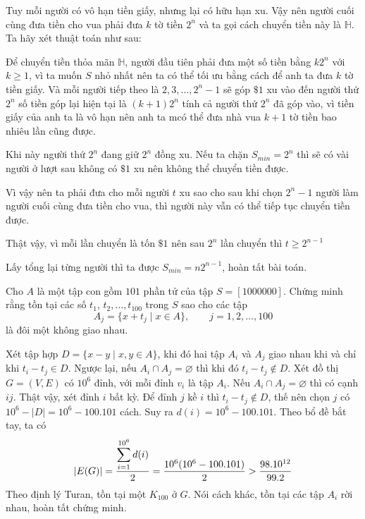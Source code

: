 \documentclass[11pt]{scrartcl}
\begin{document}
\begin{itemize}[label=, leftmargin=0em, itemsep=0.5em]
    \begin{sol}
        Tuy mỗi người có vô hạn tiền giấy, nhưng lại có hữu hạn xu. Vậy nên người cuối cùng đưa tiền cho vua phải đưa $k$ tờ tiền $2^n$ và ta gọi cách chuyển tiền này là $\mathbb{H}$. Ta hãy xét thuật toán như sau:

        Để chuyển tiền thỏa mãn $\mathbb{H}$, người đầu tiên phải đưa một số tiền bằng $k2^n$ với $k \geq 1$, vì ta muốn $S$ nhỏ nhất nên ta có thể tối ưu bằng cách để anh ta đưa $k$ tờ tiền giấy. Và mỗi người tiếp theo là $2,3,\dots,2^{n} - 1$ sẽ góp $\$1$ xu vào đến người thứ $2^n$ số tiền góp lại hiện tại là $(k + 1)2^n$ tính cả người thứ $2^n$ đã góp vào, vì tiền giấy của anh ta là vô hạn nên anh ta mcó thể đưa nhà vua $k + 1$ tờ tiền bao nhiêu lần cũng được.


        Khi này người thứ $2^n$ đang giữ $2^n$ đồng xu. Nếu ta chặn $S_{min} = 2^n$ thì sẽ có vài người ở lượt sau không có $\$1$ xu nên không thể chuyển tiền được.


        Vì vậy nên ta phải đưa cho mỗi người $t$ xu sao cho sau khi chọn $2^{n} - 1$ người làm người cuối cùng đưa tiền cho vua, thì người này vẫn có thể tiếp tục chuyển tiền được.


        Thật vậy, vì mỗi lần chuyển là tốn $\$1$ nên sau $2^{n}$ lần chuyển thì $t \geq 2^{n - 1}$


        Lấy tổng lại từng người thì ta được $S_{min} = n2^{n - 1}$, hoàn tất bài toán.\end{sol}

        \begin{bt}
            Cho $A$ là một tập con gồm $101$ phần tử của tập $S=[1000000]$. Chứng minh rằng tồn tại các số $t_1$, $t_2, \ldots, t_{100}$ trong $S$ sao cho các tập\[ A_j=\{x+t_j\mid x\in A\},\qquad j=1,2,\ldots,100  \]là đôi một không giao nhau.
        \end{bt}
        \begin{sol}
            Xét tập hợp $D = \{x -y \mid x,y\in A\}$, khi đó hai tập $A_i$ và $A_j$ giao nhau khi và chỉ khi $t_i - t_j \in D$. Ngược lại, nếu $A_i \cap A_j = \varnothing$  thì khi đó $t_i - t_j \notin D$. Xét đồ thị $G = (V,E)$ có $10^6$ đỉnh, với mỗi đỉnh $v_i$ là tập $A_i$. Nếu $A_i \cap A_j = \varnothing$ thì có cạnh $ij$. Thật vậy, xét đỉnh $i$ bất kỳ. Để đỉnh $j$ kề $i$ thì $t_i - t_j \notin D$, thế nên chọn $j$ có $10^6 - |D| = 10^6 - 100.101$ cách. Suy ra $d(i) = 10^6 - 100.101$. Theo bổ đề bắt tay, ta có 
            \[
                |E(G)| = \frac{\dsum_{i = 1}^{10^6}d(i)}{2} = \frac{10^6(10^6 - 100.101)}{2} > \frac{98.10^{12}}{99.2}
            \]
            Theo định lý Turan, tồn tại một $K_{100}$ ở $G$. Nói cách khác, tồn tại các tập $A_i$ rời nhau, hoàn tất chứng minh.
        \end{sol}


\end{itemize}
\end{document}
